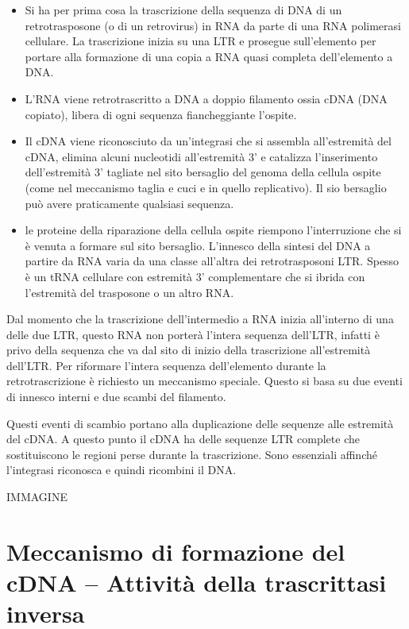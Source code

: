 \documentclass[11pt]{book}
\begin{document}
\begin{itemize}
\itemsep1pt\parskip0pt
\item
  Si ha per prima cosa la trascrizione della sequenza di DNA di un
  retrotrasposone (o di un retrovirus) in RNA da parte di una RNA
  polimerasi cellulare. La trascrizione inizia su una LTR e prosegue
  sull'elemento per portare alla formazione di una copia a RNA quasi
  completa dell'elemento a DNA.
\item
  L'RNA viene retrotrascritto a DNA a doppio filamento ossia cDNA (DNA
  copiato), libera di ogni sequenza fiancheggiante l'ospite.
\item
  Il cDNA viene riconosciuto da un'integrasi che si assembla
  all'estremità del cDNA, elimina alcuni nucleotidi all'estremità 3' e
  catalizza l'inserimento dell'estremità 3' tagliate nel sito
  bersaglio del genoma della cellula ospite (come nel meccanismo
  taglia e cuci e in quello replicativo). Il sio bersaglio può avere
  praticamente qualsiasi sequenza.
\item
  le proteine della riparazione della cellula ospite riempono
  l'interruzione che si è venuta a formare sul sito bersaglio.
  L'innesco della sintesi del DNA a partire da RNA varia da una classe
  all'altra dei retrotrasposoni LTR. Spesso è un tRNA cellulare con
  estremità 3' complementare che si ibrida con l'estremità del
  trasposone o un altro RNA.
\end{itemize}


Dal momento che la trascrizione dell'intermedio a RNA inizia all'interno
di una delle due LTR, questo RNA non porterà l'intera sequenza dell'LTR,
infatti è privo della sequenza che va dal sito di inizio della
trascrizione all'estremità dell'LTR. Per riformare l'intera sequenza
dell'elemento durante la retrotrascrizione è richiesto un meccanismo
speciale. Questo si basa su due eventi di innesco interni e due scambi
del filamento.

Questi eventi di scambio portano alla duplicazione delle sequenze alle
estremità del cDNA. A questo punto il cDNA ha delle sequenze LTR
complete che sostituiscono le regioni perse durante la trascrizione.
Sono essenziali affinché l'integrasi riconosca e quindi ricombini il
DNA.

IMMAGINE

\section{Meccanismo di formazione del cDNA -- Attività della
trascrittasi
inversa}\label{meccanismo-di-formazione-del-cdna-attivituxe0-della-trascrittasi-inversa}
\end{document}
